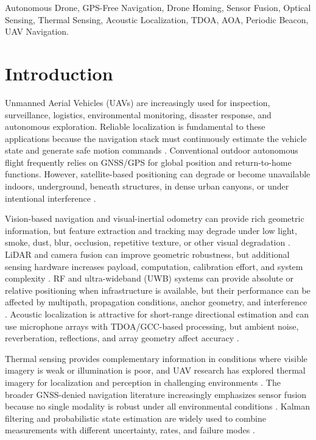 \documentclass[conference]{IEEEtran}
\begin{document}
\begin{IEEEkeywords}
Autonomous Drone, GPS-Free Navigation, Drone Homing, Sensor Fusion,
Optical Sensing, Thermal Sensing, Acoustic Localization, TDOA, AOA,
Periodic Beacon, UAV Navigation.
\end{IEEEkeywords}


\section{Introduction}

Unmanned Aerial Vehicles (UAVs) are increasingly used for inspection,
surveillance, logistics, environmental monitoring, disaster response, and
autonomous exploration. Reliable localization is fundamental to these
applications because the navigation stack must continuously estimate the
vehicle state and generate safe motion commands
\cite{mahony2012,floreano2015,faessler2018,mellinger2011}. Conventional outdoor
autonomous flight frequently relies on GNSS/GPS for global position and
return-to-home functions. However, satellite-based positioning can degrade or
become unavailable indoors, underground, beneath structures, in dense urban
canyons, or under intentional interference
\cite{jarraya2025,vanegas2016,skjetne2011}.

Vision-based navigation and visual-inertial odometry can provide rich geometric
information, but feature extraction and tracking may degrade under low light,
smoke, dust, blur, occlusion, repetitive texture, or other visual degradation
\cite{leutenegger2015,forster2017,campos2021,orbslam3}. LiDAR and camera fusion
can improve geometric robustness, but additional sensing hardware increases
payload, computation, calibration effort, and system complexity
\cite{quach2026}. RF and ultra-wideband (UWB) systems can provide absolute or
relative positioning when infrastructure is available, but their performance
can be affected by multipath, propagation conditions, anchor geometry, and
interference
\cite{zafari2019,schwarz2017,liu2014,wang2024}. Acoustic localization is
attractive for short-range directional estimation and can use microphone arrays
with TDOA/GCC-based processing, but ambient noise, reverberation, reflections,
and array geometry affect accuracy
\cite{brandstein2001,knapp1976,chen2006,do2010}.

Thermal sensing provides complementary information in conditions where visible
imagery is weak or illumination is poor, and UAV research has explored thermal
imagery for localization and perception in challenging environments
\cite{jensen2007,flir2018,thermal2026}. The broader GNSS-denied navigation
literature increasingly emphasizes sensor fusion because no single modality is
robust under all environmental conditions
\cite{jarraya2025,alqudsi2026}. Kalman filtering and probabilistic state
estimation are widely used to combine measurements with different uncertainty,
rates, and failure modes
\cite{welch1995,maybeck1979,barshalom2001,thrun2005}.
\end{document}
